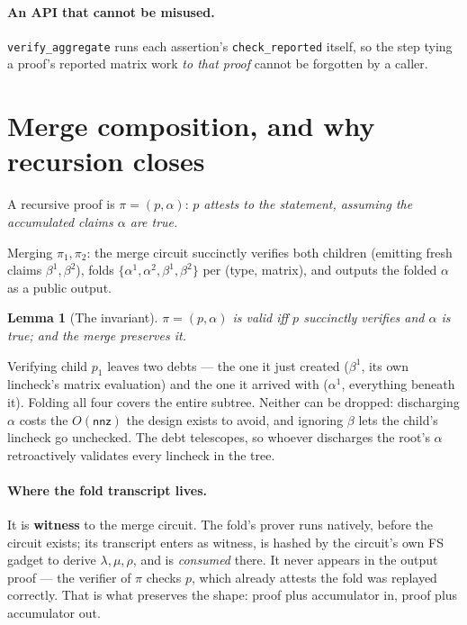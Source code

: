 \documentclass[11pt]{article}
\newcommand{\nnz}{\mathsf{nnz}}
\newcommand{\code}[1]{\texttt{#1}}
\newtheorem{lemma}{Lemma}
\theoremstyle{definition}
\begin{document}
\paragraph{An API that cannot be misused.} \code{verify\_aggregate} runs
each assertion's \code{check\_reported} itself, so the step tying a proof's
reported matrix work \emph{to that proof} cannot be forgotten by a caller.

\section{Merge composition, and why recursion closes}\label{sec:merge}

A recursive proof is $\pi = (p, \alpha)$: \emph{$p$ attests to the
statement, assuming the accumulated claims $\alpha$ are true.}

Merging $\pi_1, \pi_2$: the merge circuit succinctly verifies both children
(emitting fresh claims $\beta^1, \beta^2$), folds
$\{\alpha^1, \alpha^2, \beta^1, \beta^2\}$ per (type, matrix), and outputs
the folded $\alpha$ as a public output.

\begin{lemma}[The invariant]
$\pi = (p, \alpha)$ is valid iff $p$ succinctly verifies and $\alpha$ is
true; and the merge preserves it.
\end{lemma}

Verifying child $p_1$ leaves two debts --- the one it just created
($\beta^1$, its own lincheck's matrix evaluation) and the one it arrived
with ($\alpha^1$, everything beneath it). Folding all four covers the entire
subtree. Neither can be dropped: discharging $\alpha$ costs the $O(\nnz)$
the design exists to avoid, and ignoring $\beta$ lets the child's lincheck
go unchecked. The debt telescopes, so whoever discharges the root's $\alpha$
retroactively validates every lincheck in the tree.

\paragraph{Where the fold transcript lives.} It is \textbf{witness} to the
merge circuit. The fold's prover runs natively, before the circuit exists;
its transcript enters as witness, is hashed by the circuit's own FS gadget
to derive $\lambda, \mu, \rho$, and is \emph{consumed} there. It never
appears in the output proof --- the verifier of $\pi$ checks $p$, which
already attests the fold was replayed correctly. That is what preserves the
shape: proof plus accumulator in, proof plus accumulator out.
\end{document}
